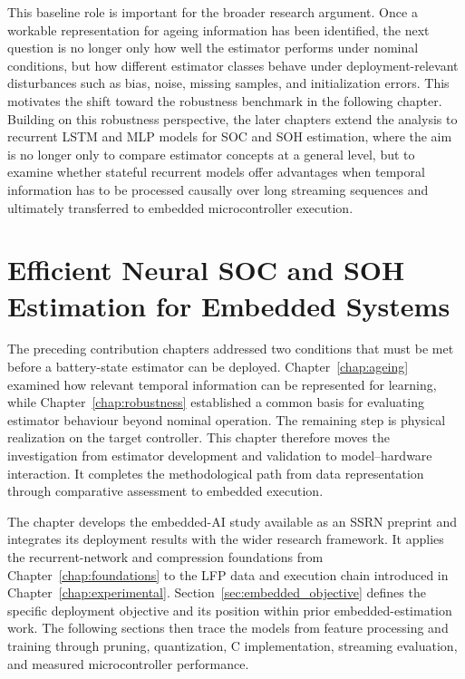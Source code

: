 \documentclass[
    a4paper,
    12pt,
    titlepage,
    bibliography=totoc,
    twoside=on,
    parskip=false,
    numbers=noenddot,
    cleardoublepage=empty,
    DIV=12,
    BCOR=12.0mm,
    headheight=36pt,
    headings=openright
]{scrreprt}
\begin{document}
This baseline role is important for the broader research argument. Once a workable representation for ageing information has been identified, the next question is no longer only how well the estimator performs under nominal conditions, but how different estimator classes behave under deployment-relevant disturbances such as bias, noise, missing samples, and initialization errors. This motivates the shift toward the robustness benchmark in the following chapter. Building on this robustness perspective, the later chapters extend the analysis to recurrent LSTM and MLP models for SOC and SOH estimation, where the aim is no longer only to compare estimator concepts at a general level, but to examine whether stateful recurrent models offer advantages when temporal information has to be processed causally over long streaming sequences and ultimately transferred to embedded microcontroller execution.



\chapter{Efficient Neural SOC and SOH Estimation for Embedded Systems}
\label{chap:embedded}
The preceding contribution chapters addressed two conditions that must be met before a battery-state estimator can be deployed. Chapter~\ref{chap:ageing} examined how relevant temporal information can be represented for learning, while Chapter~\ref{chap:robustness} established a common basis for evaluating estimator behaviour beyond nominal operation. The remaining step is physical realization on the target controller. This chapter therefore moves the investigation from estimator development and validation to model--hardware interaction. It completes the methodological path from data representation through comparative assessment to embedded execution.

The chapter develops the embedded-AI study available as an SSRN preprint and integrates its deployment results with the wider research framework.\autocite{rzepkaEmbeddedArtificialIntelligence2026} It applies the recurrent-network and compression foundations from Chapter~\ref{chap:foundations} to the LFP data and execution chain introduced in Chapter~\ref{chap:experimental}. Section~\ref{sec:embedded_objective} defines the specific deployment objective and its position within prior embedded-estimation work. The following sections then trace the models from feature processing and training through pruning, quantization, C implementation, streaming evaluation, and measured microcontroller performance.
\end{document}
